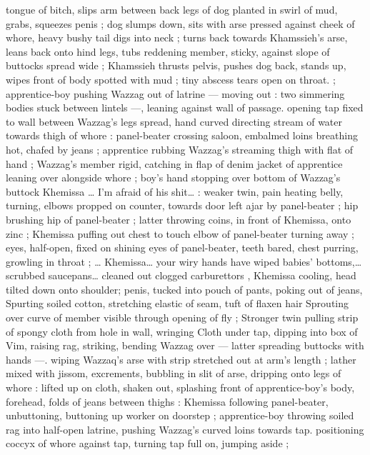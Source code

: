 {tongue of bitch, slips arm between back legs of dog planted in swirl 
of mud, grabs, squeezes penis ; dog slumps down, sits with arse 
pressed against cheek of whore, heavy bushy tail digs into neck ; 
turns back towards Khamssieh's arse, leans back onto hind legs, 
tubs reddening member, sticky, against slope of buttocks spread 
wide ; Khamssieh thrusts pelvis, pushes dog back, stands up, wipes 
front of body spotted with mud ; tiny abscess tears open on throat.{\gr} 
; apprentice-boy pushing Wazzag out of latrine --- moving out : two 
simmering bodies stuck between lintels ---, leaning against wall of 
passage. opening tap fixed to wall between Wazzag's legs spread, 
hand curved directing stream of water towards thigh of whore : 
panel-beater crossing saloon, embalmed loins breathing hot, chafed 
by jeans ; apprentice rubbing Wazzag's streaming thigh with flat of 
hand ; Wazzag's member rigid, catching in flap of denim jacket of 
apprentice leaning over alongside whore ; boy's hand stopping over 
bottom of Wazzag's buttock{\td} {\gl} Khemissa {\ldots} I'm afraid of his shit{\ldots} {\gr} 
: weaker twin, pain heating belly, turning, elbows propped on 
counter, towards door left ajar by panel-beater ; hip brushing hip of 
panel-beater ; latter throwing coins, in front of Khemissa, onto zinc ; 
Khemissa puffing out chest to touch elbow of panel-beater turning 
away ; eyes, half-open, fixed on shining eyes of panel-beater, teeth 
bared, chest purring, growling in throat ; {\ldots}{\gl} Khemissa{\ldots} your wiry 
hands have wiped babies' bottoms,{\ldots} scrubbed saucepans{\ldots} cleaned 
out clogged carburettors{\td} {\gr}, Khemissa cooling, head tilted down onto 
shoulder; penis, tucked into pouch of pants, poking out of jeans, 
Spurting soiled cotton, stretching elastic of seam, tuft of flaxen hair 
Sprouting over curve of member visible through opening of fly ; 
Stronger twin pulling strip of spongy cloth from hole in wall, wringing 
Cloth under tap, dipping into box of Vim, raising rag, striking, 
bending Wazzag over --- latter spreading buttocks with hands ---. 
wiping Wazzaq's arse with strip stretched out at arm's length ; lather 
mixed with jissom, excrements, bubbling in slit of arse, dripping onto 
legs of whore : lifted up on cloth, shaken out, splashing front of 
apprentice-boy's body, forehead, folds of jeans between thighs : 
Khemissa following panel-beater, unbuttoning, buttoning up worker 
on doorstep ; apprentice-boy throwing soiled rag into half-open 
latrine, pushing Wazzag's curved loins towards tap. positioning 
coccyx of whore against tap, turning tap full on, jumping aside ; 
}
